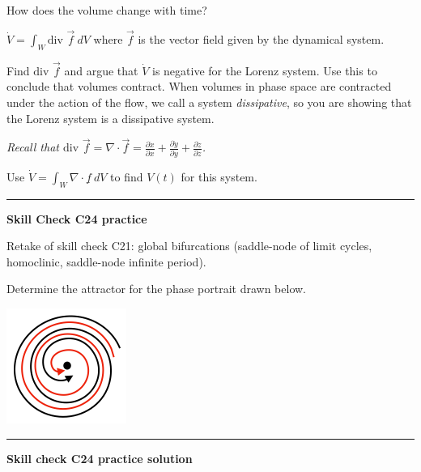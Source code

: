 \documentclass[12pt,letterpaper,noanswers]{exam}
\begin{document}
How does the volume change with time?  

$\displaystyle \dot{V} = \int_W \text{div }\vec{f}\ dV$ where $\vec f$ is the vector field given by the dynamical system.  
\begin{parts}
\item Find $\text{div }\vec f$ and argue that $\dot{V}$ is negative for the Lorenz system.  Use this to conclude that volumes contract.  When volumes in phase space are contracted under the action of the flow, we call a system \emph{dissipative}, so you are showing that the Lorenz system is a dissipative system.

\emph{Recall that $\text{div }\vec f = \nabla \cdot \vec f = \frac{\partial \dot x}{\partial x} + \frac{\partial \dot y}{\partial y} + \frac{\partial \dot z}{\partial z}$.}

\item Use $\dot V = \int_W \nabla \cdot \underline{f}\ dV$ to find $V(t)$ for this system.

\end{parts}

\vspace{0.2cm}
\hrule
\vspace{0.2cm}

\noindent\textbf{Skill Check C24 practice}
\begin{questions}
\item Retake of skill check C21: global bifurcations (saddle-node of limit cycles, homoclinic, saddle-node infinite period).

\item Determine the attractor for the phase portrait drawn below.

\includegraphics[]{img/C26-2019-11-06p2.png}

\end{questions}

\vspace{0.2cm}

\hrule
\vspace{0.2cm}

\noindent\textbf{Skill check C24 practice solution}
\end{document}
